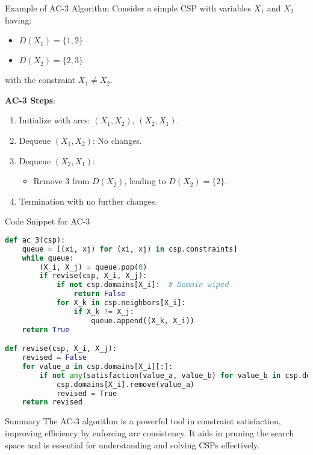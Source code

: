\documentclass[aspectratio=169]{beamer}
\begin{document}
\begin{frame}{Example of AC-3 Algorithm}
    Consider a simple CSP with variables \( X_1 \) and \( X_2 \) having:
    \begin{itemize}
        \item \( D(X_1) = \{1, 2\} \)
        \item \( D(X_2) = \{2, 3\} \)
    \end{itemize}
    with the constraint \( X_1 \neq X_2 \).

    \textbf{AC-3 Steps}:
    \begin{enumerate}
        \item Initialize with arcs: \( (X_1, X_2) \), \( (X_2, X_1) \).
        \item Dequeue \( (X_1, X_2) \): No changes.
        \item Dequeue \( (X_2, X_1) \):
        \begin{itemize}
            \item Remove \( 3 \) from \( D(X_2) \), leading to \( D(X_2) = \{2\} \).
        \end{itemize}
        \item Termination with no further changes.
    \end{enumerate}
\end{frame}

\begin{frame}[fragile]{Code Snippet for AC-3}
    \begin{lstlisting}[language=Python]
def ac_3(csp):
    queue = [(xi, xj) for (xi, xj) in csp.constraints]
    while queue:
        (X_i, X_j) = queue.pop(0)
        if revise(csp, X_i, X_j):
            if not csp.domains[X_i]:  # Domain wiped
                return False
            for X_k in csp.neighbors[X_i]:
                if X_k != X_j:
                    queue.append((X_k, X_i))
    return True

def revise(csp, X_i, X_j):
    revised = False
    for value_a in csp.domains[X_i][:]:
        if not any(satisfaction(value_a, value_b) for value_b in csp.domains[X_j]):
            csp.domains[X_i].remove(value_a)
            revised = True
    return revised
    \end{lstlisting}
\end{frame}

\begin{frame}{Summary}
    The AC-3 algorithm is a powerful tool in constraint satisfaction, improving efficiency by enforcing arc consistency. It aids in pruning the search space and is essential for understanding and solving CSPs effectively.
\end{frame}
\end{document}
